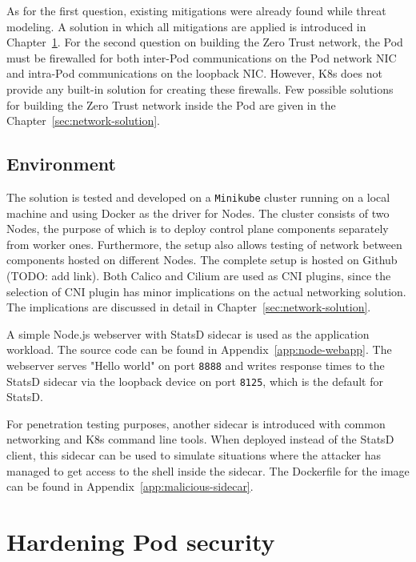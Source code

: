 \documentclass[english, 12pt, a4paper, sci, utf8, a-2b, online]{aaltothesis}
\begin{document}
As for the first question, existing mitigations were already found while threat modeling. A solution in which all mitigations are applied is introduced in Chapter~\ref{sec:pod-hardening}. For the second question on building the Zero Trust network, the Pod must be firewalled for both inter-Pod communications on the Pod network NIC and intra-Pod communications on the loopback NIC. However, K8s does not provide any built-in solution for creating these firewalls. Few possible solutions for building the Zero Trust network inside the Pod are given in the Chapter~\ref{sec:network-solution}.


\subsection{Environment}

The solution is tested and developed on a \texttt{Minikube} cluster running on a local machine and using Docker as the driver for Nodes. The cluster consists of two Nodes, the purpose of which is to deploy control plane components separately from worker ones. Furthermore, the setup also allows testing of network between components hosted on different Nodes. The complete setup is hosted on Github (TODO: add link). Both Calico and Cilium are used as CNI plugins, since the selection of CNI plugin has minor implications on the actual networking solution. The implications are discussed in detail in Chapter~\ref{sec:network-solution}.

A simple Node.js webserver with StatsD sidecar is used as the application workload. The source code can be found in Appendix~\ref{app:node-webapp}. The webserver serves "Hello world" on port \texttt{8888} and writes response times to the StatsD sidecar via the loopback device on port \texttt{8125}, which is the default for StatsD.

For penetration testing purposes, another sidecar is introduced with common networking and K8s command line tools. When deployed instead of the StatsD client, this sidecar can be used to simulate situations where the attacker has managed to get access to the shell inside the sidecar. The Dockerfile for the image can be found in Appendix~\ref{app:malicious-sidecar}.

\clearpage

\section{Hardening Pod security} \label{sec:pod-hardening}
\end{document}
